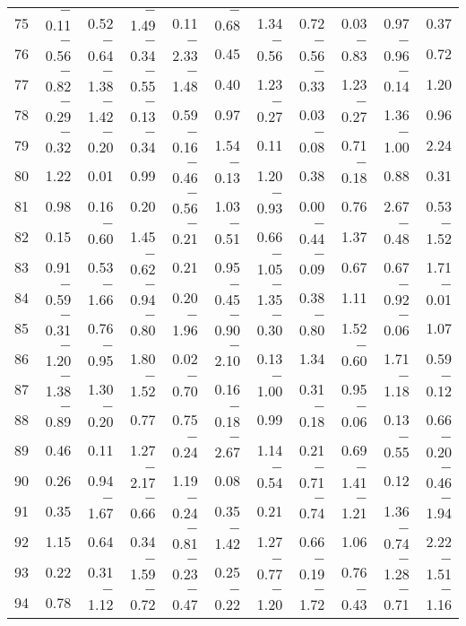 \documentclass[letterpaper]{article}
\begin{document}
\begin{Schunk}
\begin{longtable}{rrrrrrrrrrr}
  75 & $-$0.11 & 0.52 & $-$1.49 & 0.11 & $-$0.68 & 1.34 & 0.72 & 0.03 & 0.97 & 0.37 \\
  76 & $-$0.56 & $-$0.64 & $-$0.34 & $-$2.33 & 0.45 & $-$0.56 & $-$0.56 & $-$0.83 & $-$0.96 & 0.72 \\
  77 & $-$0.82 & $-$1.38 & $-$0.55 & $-$1.48 & 0.40 & 1.23 & $-$0.33 & 1.23 & $-$0.14 & 1.20 \\
  78 & $-$0.29 & $-$1.42 & $-$0.13 & 0.59 & 0.97 & $-$0.27 & 0.03 & $-$0.27 & 1.36 & 0.96 \\
  79 & $-$0.32 & $-$0.20 & $-$0.34 & $-$0.16 & 1.54 & 0.11 & $-$0.08 & 0.71 & $-$1.00 & 2.24 \\
  80 & 1.22 & 0.01 & 0.99 & $-$0.46 & $-$0.13 & 1.20 & 0.38 & $-$0.18 & 0.88 & 0.31 \\
  81 & 0.98 & 0.16 & 0.20 & $-$0.56 & 1.03 & $-$0.93 & 0.00 & 0.76 & 2.67 & 0.53 \\
  82 & 0.15 & $-$0.60 & 1.45 & $-$0.21 & $-$0.51 & 0.66 & $-$0.44 & 1.37 & $-$0.48 & $-$1.52 \\
  83 & 0.91 & 0.53 & $-$0.62 & 0.21 & 0.95 & $-$1.05 & $-$0.09 & 0.67 & 0.67 & 1.71 \\
  84 & $-$0.59 & $-$1.66 & $-$0.94 & 0.20 & $-$0.45 & $-$1.35 & 0.38 & 1.11 & $-$0.92 & $-$0.01 \\
  85 & $-$0.31 & 0.76 & $-$0.80 & $-$1.96 & $-$0.90 & $-$0.30 & $-$0.80 & 1.52 & $-$0.06 & 1.07 \\
  86 & $-$1.20 & $-$0.95 & 1.80 & 0.02 & $-$2.10 & 0.13 & 1.34 & $-$0.60 & 1.71 & 0.59 \\
  87 & $-$1.38 & 1.30 & $-$1.52 & $-$0.70 & 0.16 & $-$1.00 & 0.31 & 0.95 & $-$1.18 & $-$0.12 \\
  88 & $-$0.89 & $-$0.20 & 0.77 & 0.75 & $-$0.18 & 0.99 & $-$0.18 & $-$0.06 & 0.13 & 0.66 \\
  89 & 0.46 & 0.11 & 1.27 & $-$0.24 & $-$2.67 & 1.14 & 0.21 & 0.69 & $-$0.55 & $-$0.20 \\
  90 & 0.26 & 0.94 & $-$2.17 & 1.19 & 0.08 & $-$0.54 & $-$0.71 & $-$1.41 & 0.12 & $-$0.46 \\
  91 & 0.35 & $-$1.67 & $-$0.66 & $-$0.24 & 0.35 & 0.21 & $-$0.74 & $-$1.21 & 1.36 & $-$1.94 \\
  92 & 1.15 & 0.64 & 0.34 & $-$0.81 & $-$1.42 & 1.27 & 0.66 & 1.06 & $-$0.74 & 2.22 \\
  93 & 0.22 & 0.31 & $-$1.59 & $-$0.23 & 0.25 & $-$0.77 & $-$0.19 & 0.76 & $-$1.28 & $-$1.51 \\
  94 & 0.78 & $-$1.12 & $-$0.72 & $-$0.47 & $-$0.22 & $-$1.20 & $-$1.72 & $-$0.43 & $-$0.71 & $-$1.16 \\

\end{longtable}
\end{Schunk}
\end{document}
